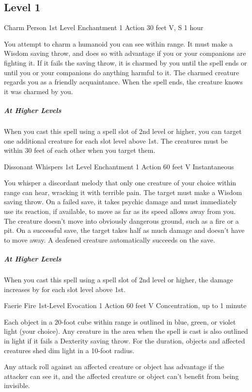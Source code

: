\documentclass[letterpaper,openany,oneside,twocolumn]{book}
\begin{document}
\subsection*{Level 1}

\DndSpellHeader
  {Charm Person}
  {1st Level Enchantment}
  {1 Action}
  {30 feet}
  {V, S}
  {1 hour}

You attempt to charm a humanoid you can see within range. It must make a Wisdom saving throw, and does so with advantage if you or your companions are fighting it. If it fails the saving throw, it is charmed by you until the spell ends or until you or your companions do anything harmful to it. The charmed creature regards you as a friendly acquaintance. When the spell ends, the creature knows it was charmed by you.

\subparagraph*{At Higher Levels} When you cast this spell using a spell slot of 2nd level or higher, you can target one additional creature for each slot level above 1st. The creatures must be within 30 feet of each other when you target them.

\DndSpellHeader
  {Dissonant Whispers}
  {1st Level Enchantment}
  {1 Action}
  {60 feet}
  {V}
  {Instantaneous}

You whisper a discordant melody that only one creature of your choice within range can hear, wracking it with terrible pain. The target must make a Wisdom saving throw. On a failed save, it takes  psychic damage and must immediately use its reaction, if available, to move as far as its speed allows away from you. The creature doesn’t move into obviously dangerous ground, such as a fire or a pit. On a successful save, the target takes half as much damage and doesn’t have to move away. A deafened creature automatically succeeds on the save.

\subparagraph*{At Higher Levels} When you cast this spell using a spell slot of 2nd level or higher, the damage increases by  for each slot level above 1st.

\DndSpellHeader
  {Faerie Fire}
  {1st-Level Evocation}
  {1 Action}
  {60 feet}
  {V}
  {Concentration, up to 1 minute}

Each object in a 20-foot cube within range is outlined in blue, green, or violet light (your choice). Any creature in the area when the spell is cast is also outlined in light if it fails a Dexterity saving throw. For the duration, objects and affected creatures shed dim light in a 10-foot radius.

Any attack roll against an affected creature or object has advantage if the attacker can see it, and the affected creature or object can't benefit from being invisible.
\end{document}
